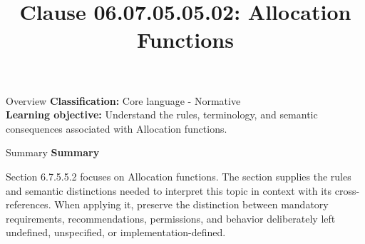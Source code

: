 \documentclass[10pt,letterpaper]{article}
\title{Clause 06.07.05.05.02: Allocation Functions}
\author{}
\date{}
\begin{document}
\maketitle
\begin{CornellOverviewBox}{Overview}
\textbf{Classification:} Core language - Normative\\[2pt]
\textbf{Learning objective:} Understand the rules, terminology, and semantic consequences associated with Allocation functions.
\end{CornellOverviewBox}\begin{CornellSummaryBox}{Summary}
{\sffamily\bfseries\color{Accent} Summary}\par\vspace{3pt}Section 6.7.5.5.2 focuses on Allocation functions. The section supplies the rules and semantic distinctions needed to interpret this topic in context with its cross-references. When applying it, preserve the distinction between mandatory requirements, recommendations, permissions, and behavior deliberately left undefined, unspecified, or implementation-defined.
\end{CornellSummaryBox}
\end{document}
